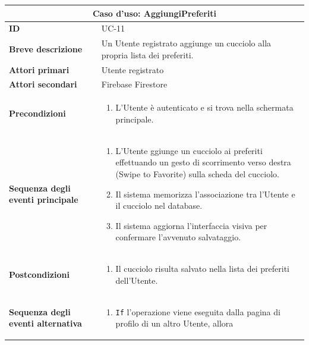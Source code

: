 \documentclass[a4paper]{report}
\begin{document}
\begin{table}[H]
\vspace*{-0cm}
\renewcommand{\arraystretch}{1.9}
\begin{tabular}{|p{3.9cm}|p{9.9cm}|}
\hline
\multicolumn{2}{|c|}{\textbf{Caso d’uso: AggiungiPreferiti}} \\ \hline
\textbf{ID} & UC-11 \\ \hline
\textbf{Breve descrizione} & Un Utente registrato aggiunge un cucciolo alla propria lista dei preferiti. \\ \hline
\textbf{Attori primari} & Utente registrato \\ \hline
\textbf{Attori secondari} & Firebase Firestore \\ \hline
\textbf{Precondizioni} & \begin{enumerate}[leftmargin=14pt,label=\arabic*.,labelsep=0.5em,topsep=0pt,partopsep=0pt,parsep=0pt,itemsep=0pt]
    \item L'Utente è autenticato e si trova nella schermata principale.
\end{enumerate} \\ \hline
\textbf{Sequenza degli eventi principale} &
\begin{enumerate}[leftmargin=14pt,label=\arabic*.,labelsep=0.5em,topsep=0pt,partopsep=0pt,parsep=0pt,itemsep=0pt]
   \item L'Utente ggiunge un cucciolo ai preferiti effettuando un gesto di scorrimento verso destra (Swipe to Favorite) sulla scheda del cucciolo.
   \item Il sistema memorizza l'associazione tra l'Utente e il cucciolo nel database.
   \item Il sistema aggiorna l'interfaccia visiva per confermare l'avvenuto salvataggio.
\end{enumerate}\\ \hline
\textbf{Postcondizioni} &
\begin{enumerate}[leftmargin=14pt,label=\arabic*.,labelsep=0.5em,topsep=0pt,partopsep=0pt,parsep=0pt,itemsep=0pt]
\item Il cucciolo risulta salvato nella lista dei preferiti dell'Utente.
\end{enumerate} \\ \hline
\textbf{Sequenza degli eventi alternativa} & \begin{enumerate}[leftmargin=14pt,label=\arabic*.,labelsep=0.5em,topsep=0pt,partopsep=0pt,parsep=0pt,itemsep=0pt]
   \item \texttt{If} l'operazione viene eseguita dalla pagina di profilo di un altro Utente, allora

\end{enumerate}
\end{tabular}
\end{table}
\end{document}
